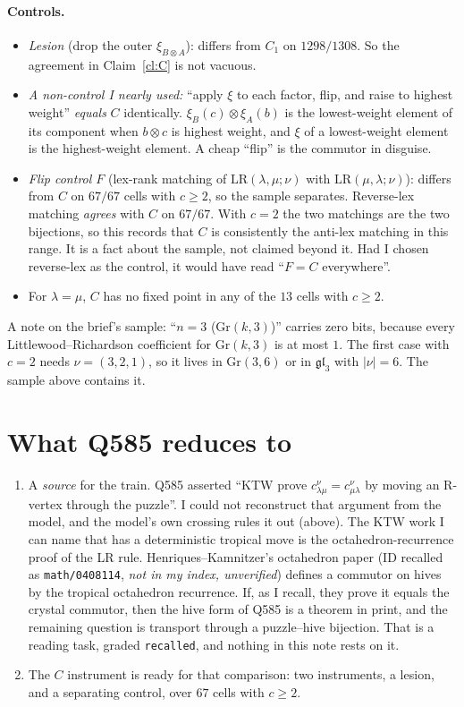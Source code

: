 \documentclass[11pt]{article}
\theoremstyle{definition}
\theoremstyle{remark}
\newcommand{\LR}{\mathrm{LR}}
\begin{document}
\paragraph{Controls.}
\begin{itemize}
\item \emph{Lesion} (drop the outer $\xi_{B\otimes A}$): differs from $C_1$ on
  $1298/1308$. So the agreement in Claim~\ref{cl:C} is not vacuous.
\item \emph{A non-control I nearly used:} ``apply $\xi$ to each factor, flip, and raise
  to highest weight'' \emph{equals} $C$ identically. $\xi_B(c)\otimes\xi_A(b)$ is the
  lowest-weight element of its component when $b\otimes c$ is highest weight, and $\xi$
  of a lowest-weight element is the highest-weight element. A cheap ``flip'' is the
  commutor in disguise.
\item \emph{Flip control $F$} (lex-rank matching of $\LR(\lambda,\mu;\nu)$ with
  $\LR(\mu,\lambda;\nu)$): differs from $C$ on $67/67$ cells with $c\ge2$, so the
  sample separates. Reverse-lex matching \emph{agrees} with $C$ on $67/67$. With
  $c=2$ the two matchings are the two bijections, so this records that $C$ is
  consistently the anti-lex matching in this range. It is a fact about the sample, not
  claimed beyond it. Had I chosen reverse-lex as the control, it would have read
  ``$F=C$ everywhere''.
\item For $\lambda=\mu$, $C$ has no fixed point in any of the $13$ cells with $c\ge2$.
\end{itemize}

\noindent A note on the brief's sample: ``$n=3$ ($\mathrm{Gr}(k,3)$)'' carries zero
bits, because every Littlewood--Richardson coefficient for $\mathrm{Gr}(k,3)$ is at most $1$.
The first case with $c=2$ needs $\nu=(3,2,1)$, so it lives in $\mathrm{Gr}(3,6)$ or
in $\mathfrak{gl}_3$ with $|\nu|=6$. The sample above contains it.

\section{What Q585 reduces to}\label{sec:next}
\begin{enumerate}
\item A \emph{source} for the train. Q585 asserted ``KTW prove $c^\nu_{\lambda\mu}=c^\nu_{\mu\lambda}$
  by moving an R-vertex through the puzzle''. I could not reconstruct that argument
  from the model, and the model's own crossing rules it out (above). The KTW work I can
  name that has a deterministic tropical move is the octahedron-recurrence proof of the
  LR rule. Henriques--Kamnitzer's octahedron paper (ID recalled as
  \texttt{math/0408114}, \emph{not in my index, unverified}) defines a commutor on
  hives by the tropical octahedron recurrence. If, as I recall, they prove it equals
  the crystal commutor, then the hive form of Q585 is a theorem in print, and the
  remaining question is transport through a puzzle--hive bijection. That is a reading
  task, graded \texttt{recalled}, and nothing in this note rests on it.
\item The $C$ instrument is ready for that comparison: two instruments, a lesion, and
  a separating control, over $67$ cells with $c\ge2$.
\end{enumerate}
\end{document}
